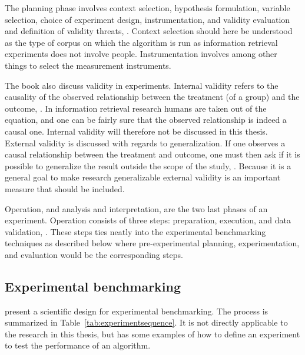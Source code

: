 The planning phase involves context selection, hypothesis formulation, variable selection, choice of experiment design, instrumentation, and validity evaluation and definition of validity threats, \parencite{Wohlin2000}. Context selection should here be understood as the type of corpus on which the algorithm is run as information retrieval experiments does not involve people. Instrumentation involves among other things to select the measurement instruments.

The book also discuss validity in experiments. Internal validity refers to the causality of the observed relationship between the treatment (of a group) and the outcome, \parencite{Wohlin2000}. In information retrieval research humans are taken out of the equation, and one can be fairly sure that the observed relationship is indeed a causal one. Internal validity will therefore not be discussed in this thesis. External validity is discussed with regards to generalization. If one observes a causal relationship between the treatment and outcome, one must then ask if it is possible to generalize the result outside the scope of the study, \parencite{Wohlin2000}. Because it is a general goal to make research generalizable external validity is an important measure that should be included.

Operation, and analysis and interpretation, are the two last phases of an experiment. Operation consists of three steps: preparation, execution, and data validation, \parencite{Wohlin2000}. These steps ties neatly into the experimental benchmarking techniques as described below where pre-experimental planning, experimentation, and evaluation would be the corresponding steps.

\subsection{Experimental benchmarking}
\cite{Bartz-Beielstein2004} present a scientific design for experimental benchmarking. The process is summarized in Table~\ref{tab:experimentsequence}. It is not directly applicable to the research in this thesis, but has some examples of how to define an experiment to test the performance of an algorithm.

